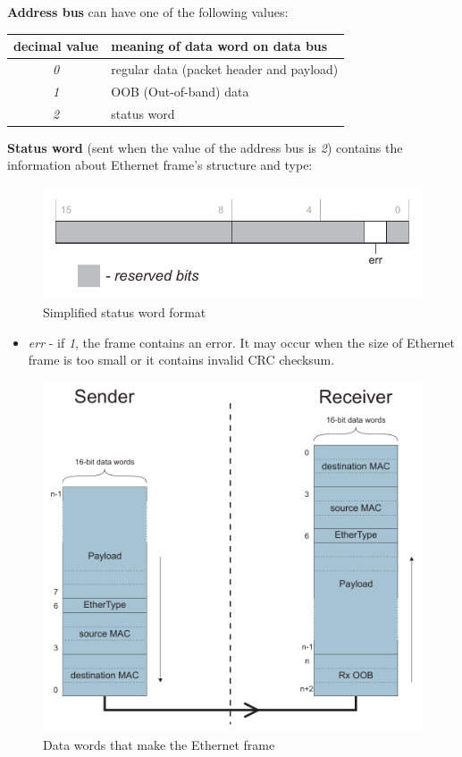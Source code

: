 {\bf Address bus} can have one of the following values:
\begin{center}
\begin{tabular}{|c|l|}
  \hline {\bf decimal value} & {\bf meaning of data word on data bus}\\
  \hline
  \emph{0} & regular data (packet header and payload)\\
  \emph{1} & OOB (Out-of-band) data\\
  \emph{2} & status word\\
  \hline
\end{tabular}
\end{center}

{\bf Status word} (sent when the value of the address bus is \emph{2}) contains
the information about Ethernet frame's structure and type:
\begin{figure}[ht]
  \begin{center}
    \includegraphics[width=.6\textwidth]{fig/basic_wrf_status.pdf}
    \caption{Simplified status word format}
  \end{center}
\end{figure}

\begin{itemize}
  \item[] \emph{err} - if \emph{1}, the frame contains an error. It may occur when
    the size of Ethernet frame is too small or it contains invalid CRC checksum.
\end{itemize}
\begin{figure}[hbt]
  \begin{center}
    \includegraphics[width=.6\textwidth]{fig/basic_wrf_data.pdf}
    \caption{Data words that make the Ethernet frame}
    \label{fig:fabric:simple_data}
  \end{center}
\end{figure}

